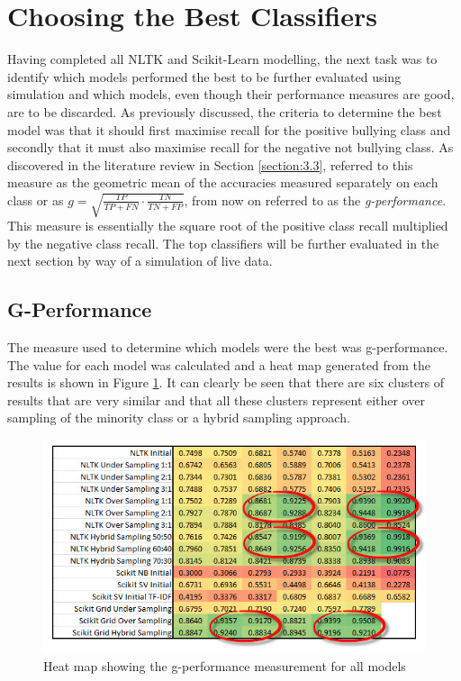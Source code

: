 \section{Choosing the Best Classifiers}
\label{subsection:best-classifiers}

Having completed all NLTK and Scikit-Learn modelling, the next task was to identify which models performed the best to be further evaluated using simulation and which models, even though their performance measures are good, are to be discarded. As previously discussed, the criteria to determine the best model was that it should first maximise recall for the positive bullying class and secondly that it must also maximise recall for the negative not bullying class. As discovered in the literature review in Section \ref{section:3.3}, \citet{kubat_addressing_1997} referred to this measure as the geometric mean of the accuracies measured separately on each class or as $g =\sqrt{\frac{TP}{TP + FN} \cdot \frac{TN}{TN + FP}}$, from now on referred to as the \textit{g-performance}. This measure is essentially the square root of the positive class recall multiplied by the negative class recall. The top classifiers will be further evaluated in the next section by way of a simulation of live data.

\subsection{G-Performance}

The measure used to determine which models were the best was g-performance. The value for each model was calculated and a heat map generated from the results is shown in Figure \ref{fig:best_model_01}. It can clearly be seen that there are six clusters of results that are very similar and that all these clusters represent either over sampling of the minority class or a hybrid sampling approach.

\begin{figure}[htbp]
	\centering
	\includegraphics[width=1\textwidth]{Figures/Chapter5/best_model_01.jpg}
	\caption[Best Model - G-Performance heat map]{Heat map showing the g-performance measurement for all models}
	\label{fig:best_model_01}
\end{figure}

